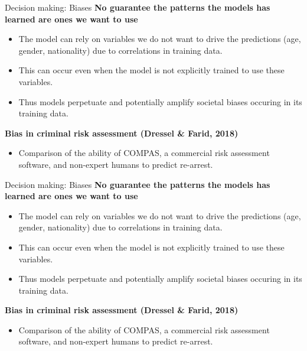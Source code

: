 \documentclass[8pt]{beamer}
\begin{document}
	\begin{frame}[t]{Decision making: Biases} %
		\textbf{No guarantee the patterns the models has learned are ones we want to use}
		\begin{itemize}
			\item The model can rely on variables we do not want to drive the predictions (age, gender, nationality) due to correlations in training data.
			\item This can occur even when the model is not explicitly trained to use these variables.
			\item Thus models perpetuate and potentially amplify societal biases occuring in its training data.
		\end{itemize}
		\textbf{Bias in criminal risk assessment (Dressel \& Farid, 2018)}
		\begin{itemize}
			\item Comparison of the ability of COMPAS, a commercial risk assessment software, and non-expert humans to predict re-arrest.
		\end{itemize}
	\end{frame}

	\begin{frame}[t]{Decision making: Biases} %
		\textbf{No guarantee the patterns the models has learned are ones we want to use}
		\begin{itemize}
			\item The model can rely on variables we do not want to drive the predictions (age, gender, nationality) due to correlations in training data.
			\item This can occur even when the model is not explicitly trained to use these variables.
			\item Thus models perpetuate and potentially amplify societal biases occuring in its training data.
		\end{itemize}
		\textbf{Bias in criminal risk assessment (Dressel \& Farid, 2018)}
		\begin{itemize}
			\item Comparison of the ability of COMPAS, a commercial risk assessment software, and non-expert humans to predict re-arrest.
		\end{itemize}
		\centering
	\end{frame}
\end{document}
